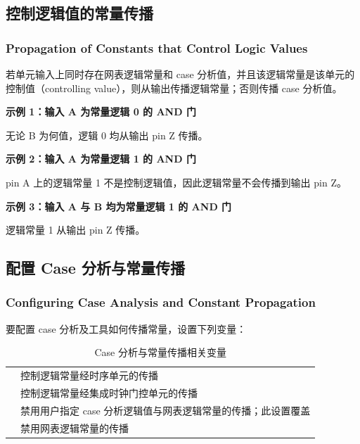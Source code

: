 \subsection{控制逻辑值的常量传播}
\subsubsection*{Propagation of Constants that Control Logic Values}

若单元输入上同时存在网表逻辑常量和 case 分析值，并且该逻辑常量是该单元的控制值（controlling value），则从输出传播逻辑常量；否则传播 case 分析值。

\textbf{示例 1：输入 A 为常量逻辑 0 的 AND 门}


无论 B 为何值，逻辑 0 均从输出 pin Z 传播。

\textbf{示例 2：输入 A 为常量逻辑 1 的 AND 门}


pin A 上的逻辑常量 1 不是控制逻辑值，因此逻辑常量不会传播到输出 pin Z。

\textbf{示例 3：输入 A 与 B 均为常量逻辑 1 的 AND 门}


逻辑常量 1 从输出 pin Z 传播。

\subsection{配置 Case 分析与常量传播}
\subsubsection*{Configuring Case Analysis and Constant Propagation}

要配置 case 分析及工具如何传播常量，设置下列变量：

\begin{table}[htbp]
\centering
\caption{Case 分析与常量传播相关变量}
\begin{tabular}{|L{5.5cm}|L{7.5cm}|}
\hline
{} &  \\
\hline
{} & 控制逻辑常量经时序单元的传播 \\
 & 控制逻辑常量经集成时钟门控单元的传播 \\
 & 禁用用户指定 case 分析逻辑值与网表逻辑常量的传播；此设置覆盖  \\
 & 禁用网表逻辑常量的传播 \\
\hline
\end{tabular}
\end{table}

